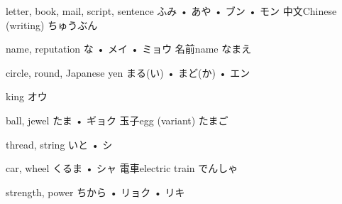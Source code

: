 



\setcounter{cardnum}{73}

		{letter, book, mail, script, sentence}
		{ふみ • あや • ブン • モン}
		{中文}{Chinese (writing) ちゅうぶん}
		{}{}
		{}{}
		{}{}
		{}{}

		{name, reputation}
		{な • メイ • ミョウ}
		{名前}{name なまえ}
		{}{}
		{}{}
		{}{}
		{}{}

		{circle, round, Japanese yen}
		{まる(い) • まど(か) • エン}
		{}{}
		{}{}
		{}{}
		{}{}
		{}{}

		{king}
		{オウ}
		{}{}
		{}{}
		{}{}
		{}{}
		{}{}

		{ball, jewel}
		{たま • ギョク}
		{玉子}{egg (variant) たまご}
		{}{}
		{}{}
		{}{}
		{}{}

		{thread, string}
		{いと • シ}
		{}{}
		{}{}
		{}{}
		{}{}
		{}{}

		{car, wheel}
		{くるま • シャ}
		{電車}{electric train でんしゃ}
		{}{}
		{}{}
		{}{}
		{}{}

		{strength, power}
		{ちから • リョク • リキ}
		{}{}
		{}{}
		{}{}
		{}{}
		{}{}

